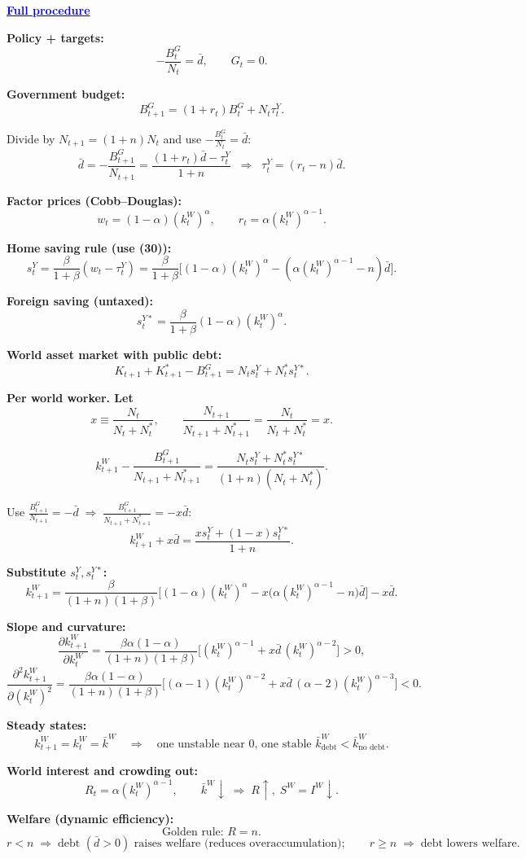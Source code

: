\documentclass[12pt]{article}
\begin{document}
\textcolor{blue}{\textbf{\uline{Full procedure}}}

{\color{blue}

\textbf{Policy + targets:}
\[
-\frac{B_t^G}{N_t}=\bar d, \qquad G_t=0.
\]

\textbf{Government budget:}
\[
B_{t+1}^G=(1+r_t)B_t^G+N_t\tau_t^Y.
\]

Divide by $N_{t+1}=(1+n)N_t$ and use $-\tfrac{B_t^G}{N_t}=\bar d$:
\[
\bar d=-\frac{B_{t+1}^G}{N_{t+1}}=\frac{(1+r_t)\bar d-\tau_t^Y}{1+n}
\;\;\Rightarrow\;\;
\boxed{\tau_t^Y=(r_t-n)\bar d.} \tag{37}
\]

\textbf{Factor prices (Cobb–Douglas):}
\[
w_t=(1-\alpha)(k_t^W)^{\alpha}, \qquad r_t=\alpha(k_t^W)^{\alpha-1}.
\]

\textbf{Home saving rule (use (30)):}
\[
s_t^Y=\frac{\beta}{1+\beta}(w_t-\tau_t^Y)
=\frac{\beta}{1+\beta}\Big[(1-\alpha)(k_t^W)^{\alpha}-(\alpha(k_t^W)^{\alpha-1}-n)\bar d\Big]. \tag{38}
\]

\textbf{Foreign saving (untaxed):}
\[
s_t^{Y*}=\frac{\beta}{1+\beta}(1-\alpha)(k_t^W)^{\alpha}.
\]

\textbf{World asset market with public debt:}
\[
K_{t+1}+K_{t+1}^*-B_{t+1}^G=N_t s_t^Y+N_t^* s_t^{Y*}. \tag{39}
\]

\textbf{Per world worker. Let }
\[
x\equiv \frac{N_t}{N_t+N_t^*}, \qquad 
\frac{N_{t+1}}{N_{t+1}+N_{t+1}^*}=\frac{N_t}{N_t+N_t^*}=x.
\]

\[
k_{t+1}^W-\frac{B_{t+1}^G}{N_{t+1}+N_{t+1}^*}
=\frac{N_t s_t^Y+N_t^* s_t^{Y*}}{(1+n)(N_t+N_t^*)}.
\]

Use $\tfrac{B_{t+1}^G}{N_{t+1}}=-\bar d \;\Rightarrow\; \tfrac{B_{t+1}^G}{N_{t+1}+N_{t+1}^*}=-x\bar d$:
\[
k_{t+1}^W+x\bar d=\frac{x s_t^Y+(1-x)s_t^{Y*}}{1+n}.
\]

\textbf{Substitute $s_t^Y,s_t^{Y*}$:}
\[
\boxed{k_{t+1}^W=\frac{\beta}{(1+n)(1+\beta)}\Big[(1-\alpha)(k_t^W)^{\alpha}-x\big(\alpha(k_t^W)^{\alpha-1}-n\big)\bar d\Big]-x\bar d.}
\]

\textbf{Slope and curvature:}
\[
\frac{\partial k_{t+1}^W}{\partial k_t^W}
=\frac{\beta\alpha(1-\alpha)}{(1+n)(1+\beta)}\Big[(k_t^W)^{\alpha-1}+x\bar d\,(k_t^W)^{\alpha-2}\Big]>0,
\]
\[
\frac{\partial^2 k_{t+1}^W}{\partial (k_t^W)^2}
=\frac{\beta\alpha(1-\alpha)}{(1+n)(1+\beta)}\Big[(\alpha-1)(k_t^W)^{\alpha-2}+x\bar d\,(\alpha-2)(k_t^W)^{\alpha-3}\Big]<0.
\]

\textbf{Steady states:}
\[
k_{t+1}^W=k_t^W=\bar k^W \quad \Rightarrow \quad
\text{one unstable near 0, one stable } \bar k^W_{\text{debt}}<\bar k^W_{\text{no debt}}.
\]

\textbf{World interest and crowding out:}
\[
R_t=\alpha(k_t^W)^{\alpha-1}, \qquad \bar k^W \downarrow \;\Rightarrow\; R \uparrow,\; S^W=I^W \downarrow.
\]

\textbf{Welfare (dynamic efficiency):}
\[
\text{Golden rule: } R=n.
\]
\[
\boxed{r<n \;\Rightarrow\; \text{debt }(\bar d>0)\text{ raises welfare (reduces overaccumulation)};
\qquad r\ge n \;\Rightarrow\; \text{debt lowers welfare}.}
\]

}
\end{document}
